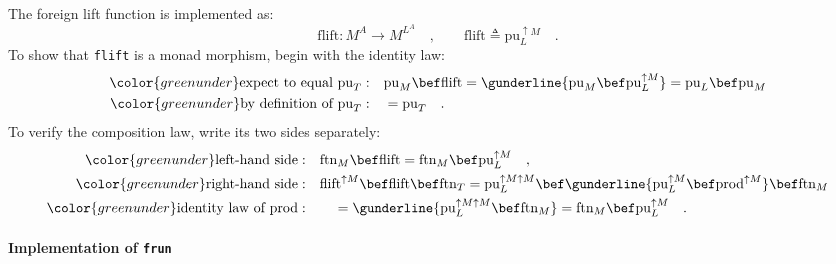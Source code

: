 The foreign lift function is implemented as:
\[
\text{flift}:M^{A}\rightarrow M^{L^{A}}\quad,\quad\quad\text{flift}\triangleq\text{pu}_{L}^{\uparrow M}\quad.
\]
To show that \lstinline!flift! is a monad morphism, begin with the
identity law:
\begin{align*}
{\color{greenunder}\text{expect to equal }\text{pu}_{T}:}\quad & \text{pu}_{M}\bef\text{flift}=\gunderline{\text{pu}_{M}\bef\text{pu}_{L}^{\uparrow M}}=\text{pu}_{L}\bef\text{pu}_{M}\\
{\color{greenunder}\text{by definition of }\text{pu}_{T}:}\quad & =\text{pu}_{T}\quad.
\end{align*}
To verify the composition law, write its two sides separately:
\begin{align*}
{\color{greenunder}\text{left-hand side}:}\quad & \text{ftn}_{M}\bef\text{flift}=\text{ftn}_{M}\bef\text{pu}_{L}^{\uparrow M}\quad,\\
{\color{greenunder}\text{right-hand side}:}\quad & \text{flift}^{\uparrow M}\bef\text{flift}\bef\text{ftn}_{T}=\text{pu}_{L}^{\uparrow M\uparrow M}\bef\gunderline{\text{pu}_{L}^{\uparrow M}\bef\text{prod}^{\uparrow M}}\bef\text{ftn}_{M}\\
{\color{greenunder}\text{identity law of }\text{prod}:}\quad & \quad=\gunderline{\text{pu}_{L}^{\uparrow M\uparrow M}\bef\text{ftn}_{M}}=\text{ftn}_{M}\bef\text{pu}_{L}^{\uparrow M}\quad.
\end{align*}


\paragraph{Implementation of \texttt{frun}}

